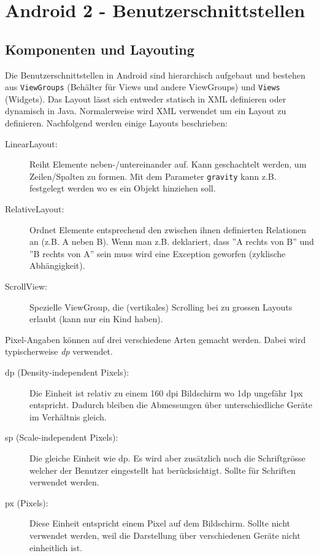 \chapter{Android 2 - Benutzerschnittstellen}

\section{Komponenten und Layouting}

Die Benutzerschnittstellen in Android sind hierarchisch aufgebaut und bestehen aus \texttt{ViewGroups} (Behälter für Views und andere ViewGroups) und \texttt{Views} (Widgets). Das Layout lässt sich entweder statisch in XML definieren oder dynamisch in Java. Normalerweise wird XML verwendet um ein Layout zu definieren. Nachfolgend werden einige Layouts beschrieben:
\begin{description}
	\item[LinearLayout:] Reiht Elemente neben-/untereinander auf. Kann geschachtelt werden, um Zeilen/Spalten zu formen. Mit dem Parameter \texttt{gravity} kann z.B. festgelegt werden wo es ein Objekt hinziehen soll.
	\item[RelativeLayout:] Ordnet Elemente entsprechend den zwischen ihnen definierten Relationen an (z.B. A neben B). Wenn man z.B. deklariert, dass ''A rechts von B'' und ''B rechts von A'' sein muss wird eine Exception geworfen (zyklische Abhängigkeit).
	\item[ScrollView:] Spezielle ViewGroup, die (vertikales) Scrolling bei zu grossen Layouts erlaubt (kann nur ein Kind haben).
\end{description}
Pixel-Angaben können auf drei verschiedene Arten gemacht werden. Dabei wird typischerweise \emph{dp} verwendet.
\begin{description}
	\item[dp (Density-independent Pixels):] Die Einheit ist relativ zu einem 160 dpi Bildschirm wo 1dp ungefähr 1px entspricht. Dadurch bleiben die Abmessungen über unterschiedliche Geräte im Verhältnis gleich.
	\item[sp (Scale-independent Pixels):] Die gleiche Einheit wie dp. Es wird aber zusätzlich noch die Schriftgrösse welcher der Benutzer eingestellt hat berücksichtigt. Sollte für Schriften verwendet werden.
	\item[px (Pixels):] Diese Einheit entspricht einem Pixel auf dem Bildschirm. Sollte nicht verwendet werden, weil die Darstellung über verschiedenen Geräte nicht einheitlich ist.
\end{description}

